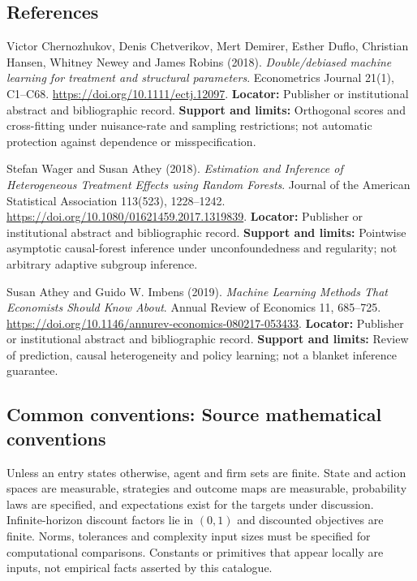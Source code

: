 \documentclass[11pt,a4paper]{article}
\begin{document}
\subsection*{References}

\begin{enumerate}[label={[\textnormal{S}\arabic*]},leftmargin=*]

\item Victor Chernozhukov, Denis Chetverikov, Mert Demirer, Esther Duflo, Christian Hansen, Whitney Newey and James Robins (2018). \emph{Double/debiased machine learning for treatment and structural parameters}. Econometrics Journal 21(1), C1–C68. \url{https://doi.org/10.1111/ectj.12097}. \textbf{Locator:} Publisher or institutional abstract and bibliographic record. \textbf{Support and limits:} Orthogonal scores and cross-fitting under nuisance-rate and sampling restrictions; not automatic protection against dependence or misspecification.

\item Stefan Wager and Susan Athey (2018). \emph{Estimation and Inference of Heterogeneous Treatment Effects using Random Forests}. Journal of the American Statistical Association 113(523), 1228–1242. \url{https://doi.org/10.1080/01621459.2017.1319839}. \textbf{Locator:} Publisher or institutional abstract and bibliographic record. \textbf{Support and limits:} Pointwise asymptotic causal-forest inference under unconfoundedness and regularity; not arbitrary adaptive subgroup inference.

\item Susan Athey and Guido W. Imbens (2019). \emph{Machine Learning Methods That Economists Should Know About}. Annual Review of Economics 11, 685–725. \url{https://doi.org/10.1146/annurev-economics-080217-053433}. \textbf{Locator:} Publisher or institutional abstract and bibliographic record. \textbf{Support and limits:} Review of prediction, causal heterogeneity and policy learning; not a blanket inference guarantee.

\end{enumerate}

\subsection*{Common conventions: Source mathematical conventions}

Unless an entry states otherwise, agent and firm sets are finite. State and action spaces are measurable, strategies and outcome maps are measurable, probability laws are specified, and expectations exist for the targets under discussion. Infinite-horizon discount factors lie in $(0,1)$ and discounted objectives are finite. Norms, tolerances and complexity input sizes must be specified for computational comparisons. Constants or primitives that appear locally are inputs, not empirical facts asserted by this catalogue.
\end{document}
